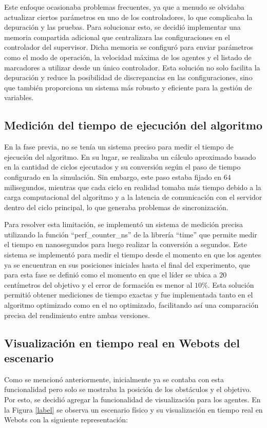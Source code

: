 Este enfoque ocasionaba problemas frecuentes, ya que a menudo se olvidaba actualizar ciertos parámetros en uno de los controladores, lo que complicaba la depuración y las pruebas. Para solucionar esto, se decidió implementar una memoria compartida adicional que centralizara las configuraciones en el controlador del supervisor. Dicha memoria se configuró para enviar parámetros como el modo de operación, la velocidad máxima de los agentes y el listado de marcadores a utilizar desde un único controlador. Esta solución no solo facilita la depuración y reduce la posibilidad de discrepancias en las configuraciones, sino que también proporciona un sistema más robusto y eficiente para la gestión de variables.

\subsection{Medición del tiempo de ejecución del algoritmo}
En la fase previa, no se tenía un sistema preciso para medir el tiempo de ejecución del algoritmo. En su lugar, se realizaba un cálculo aproximado basado en la cantidad de ciclos ejecutados y su conversión según el paso de tiempo configurado en la simulación. Sin embargo, este paso estaba fijado en $64$ milisegundos, mientras que cada ciclo en realidad tomaba más tiempo debido a la carga computacional del algoritmo y a la latencia de comunicación con el servidor dentro del ciclo principal, lo que generaba problemas de sincronización. 

Para resolver esta limitación, se implementó un sistema de medición precisa utilizando la función ``perf\_counter\_ns'' de la librería ``time'' que permite medir el tiempo en nanosegundos para luego realizar la conversión a segundos. Este sistema se implementó para medir el tiempo desde el momento en que los agentes ya se encuentran en sus posiciones iniciales hasta el final del experimento, que para esta fase se definió como el momento en que el líder se ubica a $20$ centímetros del objetivo y el error de formación es menor al $10\%$. Esta solución permitió obtener mediciones de tiempo exactas y fue implementada tanto en el algoritmo optimizado como en el no optimizado, facilitando así una comparación precisa del rendimiento entre ambas versiones.

\subsection{Visualización en tiempo real en Webots del escenario}
Como se mencionó anteriormente, inicialmente ya se contaba con esta funcionalidad pero solo se mostraba la posición de los obstáculos y el objetivo. Por esto, se decidió agregar la funcionalidad de visualización para los agentes. En la Figura \ref{label} se observa un escenario físico y su visualización en tiempo real en Webots con la siguiente representación:

